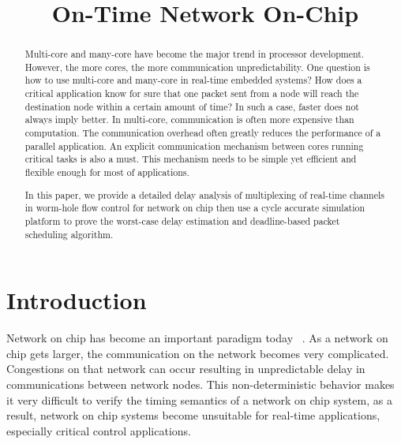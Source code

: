 \documentclass[conference, twocolumn]{IEEEtran}
\theoremstyle{definition}
\begin{document}
\title{On-Time Network On-Chip}


\maketitle

\begin{abstract}
Multi-core and many-core have become the major trend in processor development.
However, the more cores, the more communication unpredictability. One
question is how to use multi-core and many-core in real-time embedded systems?
How does a critical application know for sure that one packet sent from a node
will reach the destination node within a certain amount of time? In such a
case, faster does not always imply better. In multi-core, communication is
often more expensive than computation. The communication overhead often
greatly reduces the performance of a parallel application. An explicit
communication mechanism between cores running critical tasks is also a must.
This mechanism needs to be simple yet efficient and flexible enough for most of
applications.

In this paper, we provide a detailed delay analysis of multiplexing of real-time
channels in worm-hole flow control for network on chip then use a cycle
accurate simulation platform to prove the worst-case delay estimation and
deadline-based packet scheduling algorithm.

\end{abstract}

\section{Introduction}
Network on chip has become an important paradigm today
~\cite{DallyPacketNotWire}. As a network on chip gets larger, the communication on the network becomes very complicated. Congestions on that network can occur
resulting in unpredictable delay in communications between network nodes. This non-deterministic behavior 
makes it very difficult to verify the timing semantics of a network on chip 
system, as a result, network on chip systems become unsuitable for real-time 
applications, especially critical control applications.
\end{document}
